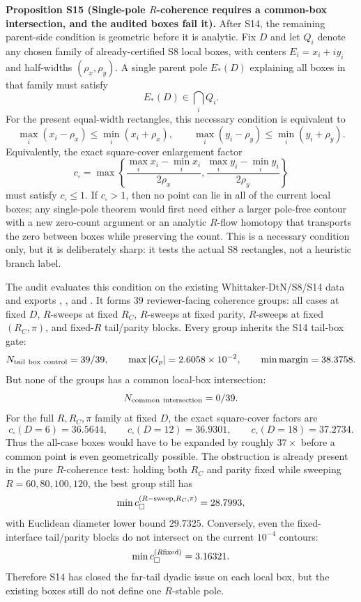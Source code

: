 \documentclass[aps,prd,onecolumn,notitlepage,nofootinbib,superscriptaddress,11pt,floatfix]{revtex4-2}
\begin{document}
\medskip\noindent\textbf{Proposition S15 (Single-pole \(R\)-coherence requires a common-box intersection, and the audited boxes fail it).}
After S14, the remaining parent-side condition is geometric before it is analytic.  Fix \(D\) and let \(Q_i\) denote any chosen family of already-certified S8 local boxes, with centers \(E_i=x_i+iy_i\) and half-widths \((\rho_x,\rho_y)\).  A single parent pole \(E_\ast(D)\) explaining all boxes in that family must satisfy
\[
E_\ast(D)\in \bigcap_i Q_i .
\]
For the present equal-width rectangles, this necessary condition is equivalent to
\[
\max_i(x_i-\rho_x)\le \min_i(x_i+\rho_x),
\qquad
\max_i(y_i-\rho_y)\le \min_i(y_i+\rho_y).
\]
Equivalently, the exact square-cover enlargement factor
\[
c_\square
=
\max\left\{
\frac{\max_i x_i-\min_i x_i}{2\rho_x},
\frac{\max_i y_i-\min_i y_i}{2\rho_y}
\right\}
\]
must satisfy \(c_\square\le1\).  If \(c_\square>1\), then no point can lie in all of the current local boxes; any single-pole theorem would first need either a larger pole-free contour with a new zero-count argument or an analytic \(R\)-flow homotopy that transports the zero between boxes while preserving the count.  This is a necessary condition only, but it is deliberately sharp: it tests the actual S8 rectangles, not a heuristic branch label.

The audit  evaluates this condition on the existing Whittaker-DtN/S8/S14 data and exports , , and .  It forms \(39\) reviewer-facing coherence groups: all cases at fixed \(D\), \(R\)-sweeps at fixed \(R_C\), \(R\)-sweeps at fixed parity, \(R\)-sweeps at fixed \((R_C,\pi)\), and fixed-\(R\) tail/parity blocks.  Every group inherits the S14 tail-box gate:
\[
N_{\rm tail\ box\ control}=39/39,\qquad
\max |G_p|=2.6058\times10^{-2},
\qquad
\min {\rm margin}=38.3758.
\]
But none of the groups has a common local-box intersection:
\[
N_{\rm common\ intersection}=0/39 .
\]
For the full \(R,R_C,\pi\) family at fixed \(D\), the exact square-cover factors are
\[
c_\square(D=6)=36.5644,\qquad
c_\square(D=12)=36.9301,\qquad
c_\square(D=18)=37.2734.
\]
Thus the all-case boxes would have to be expanded by roughly \(37\times\) before a common point is even geometrically possible.  The obstruction is already present in the pure \(R\)-coherence test: holding both \(R_C\) and parity fixed while sweeping \(R=60,80,100,120\), the best group still has
\[
\min c_\square^{(R{\rm -sweep},R_C,\pi)}
=28.7993,
\]
with Euclidean diameter lower bound \(29.7325\).  Conversely, even the fixed-interface tail/parity blocks do not intersect on the current \(10^{-4}\) contours:
\[
\min c_\square^{(R{\rm fixed})}=3.16321 .
\]
Therefore S14 has closed the far-tail dyadic issue on each local box, but the existing boxes still do not define one \(R\)-stable pole.
\end{document}
